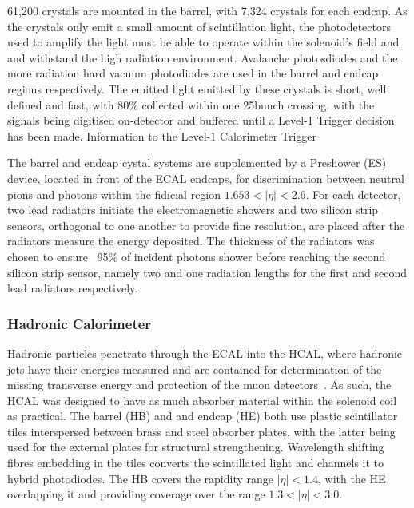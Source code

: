 61,200 crystals are mounted in the barrel, with 7,324 crystals for each endcap.
As the crystals only emit a small amount of scintillation light, the photodetectors used to amplify the light must be able to operate within the solenoid's field and and withstand the high radiation environment.
Avalanche photosdiodes and the more radiation hard vacuum photodiodes are used in the barrel and endcap regions respectively.
The emitted light emitted by these crystals is short, well defined and fast, with 80\% collected within one 25\ns bunch crossing, with the signals being digitised on-detector and buffered until a Level-1 Trigger decision has been made.
Information to the Level-1 Calorimeter Trigger

The barrel and endcap cystal systems are supplemented by a Preshower (ES) device, located in front of the ECAL endcaps, for discrimination between neutral pions and photons within the fidicial region $1.653 < |\eta| < 2.6$.
For each detector, two lead radiators initiate the electromagnetic showers and two silicon strip sensors, orthogonal to one another to provide fine resolution, are placed after the radiators measure the energy deposited.
The thickness of the radiators was chosen to ensure ~95\% of incident photons shower before reaching the second silicon strip sensor, namely two and one radiation lengths for the first and second lead radiators respectively.


\subsubsection{Hadronic Calorimeter}
Hadronic particles penetrate through the ECAL into the HCAL, where hadronic jets have their energies measured and are contained for determination of the missing transverse energy and protection of the muon detectors~\cite{HCAL:tdr}.
As such, the HCAL was designed to have as much absorber material within the solenoid coil as practical. 
The barrel (HB) and and endcap (HE) both use plastic scintillator tiles interspersed between brass and steel absorber plates, with the latter being used for the external plates for structural strengthening.
Wavelength shifting fibres embedding in the tiles converts the scintillated light and channels it to hybrid photodiodes.
The HB covers the rapidity range $|\eta| < 1.4$, with the HE overlapping it and providing coverage over the range $1.3 < |\eta| < 3.0$.

